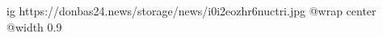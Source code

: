 
 
 
 
 

\ifcmt
  ig https://donbas24.news/storage/news/i0i2eozhr6nuctri.jpg
  @wrap center
  @width 0.9
\fi
